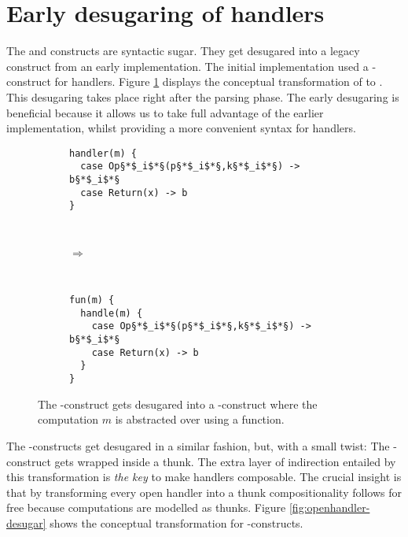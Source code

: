 \section{Early desugaring of handlers}
The  and  constructs are syntactic sugar. They get desugared into a legacy construct from an early implementation. The initial implementation used a -construct for handlers. Figure \ref{fig:closedhandler-desugar} displays the conceptual transformation of  to . 
This desugaring takes place right after the parsing phase. The early desugaring is beneficial because it allows us to take full advantage of the earlier implementation, whilst providing a more convenient syntax for handlers.
\begin{figure}[h]
    \centering
    \begin{subfigure}[c]{0.45\textwidth}
        \centering
\begin{lstlisting}[style=links]
handler(m) {
  case Op§*$_i$*§(p§*$_i$*§,k§*$_i$*§) -> b§*$_i$*§
  case Return(x) -> b
}
\end{lstlisting}
    \end{subfigure}%
    ~ 
    \begin{subfigure}[c]{0.1\textwidth}
      $\Rightarrow$
    \end{subfigure}%
    ~
    \begin{subfigure}[c]{0.45\textwidth}
        \centering
\begin{lstlisting}[style=links]
fun(m) {
  handle(m) {
    case Op§*$_i$*§(p§*$_i$*§,k§*$_i$*§) -> b§*$_i$*§
    case Return(x) -> b
  }
}
\end{lstlisting}
    \end{subfigure}
\caption{The -construct gets desugared into a -construct where the computation $m$ is abstracted over using a function.}\label{fig:closedhandler-desugar}
\end{figure}

The -constructs get desugared in a similar fashion, but, with a small twist: The -construct gets wrapped inside a thunk. The extra layer of indirection entailed by this transformation is \emph{the key} to make handlers composable. The crucial insight is that by transforming every open handler into a thunk compositionality follows for free because computations are modelled as thunks.
Figure \ref{fig:openhandler-desugar} shows the conceptual transformation for -constructs.

